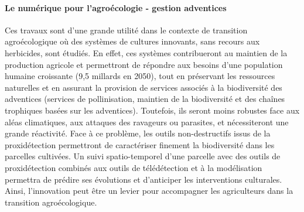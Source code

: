 \documentclass[../thesis.tex]{subfiles}
\begin{document}
    \paragraph{Le numérique pour l'agroécologie - gestion adventices} Ces travaux sont d'une grande utilité dans le contexte de transition agroécologique où des systèmes de cultures innovants, sans recours aux herbicides, sont étudiés. 
    En effet, ces systèmes contribueront au maintien de la production agricole et permettront de répondre aux besoins d'une population humaine croissante (9,5 millards en 2050), tout en préservant les ressources naturelles et en assurant la provision de services associés à la biodiversité des adventices (services de pollinisation, maintien de la biodiversité et des chaînes trophiques basées sur les adventices). Toutefois, ils seront moins robustes face aux aléas climatiques, aux attaques des ravageurs ou parasites, et nécessiteront une grande réactivité. 
    Face à ce problème, les outils non-destructifs issus de la proxidétection permettront de caractériser finement la biodiversité dans les parcelles cultivées. Un suivi spatio-temporel d'une parcelle avec des outils de proxidétection combinés aux outils de télédétection et à la modélisation permettra de prédire ses évolutions et d'anticiper les interventions culturales. Ainsi, l'innovation peut être un levier pour accompagner les agriculteurs dans la transition agroécologique. 
    
    
    
    
\end{document}
